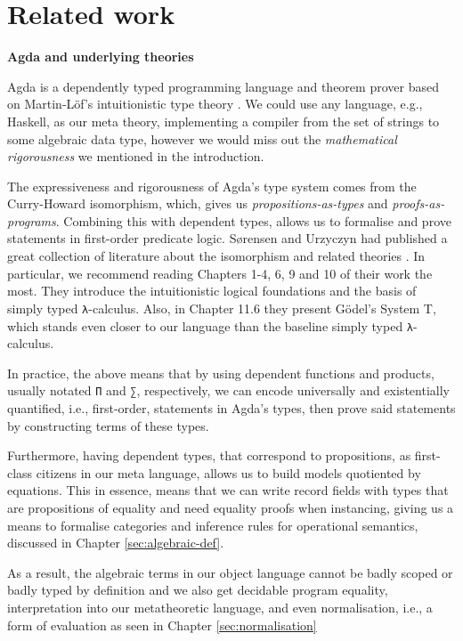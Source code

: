 \chapter{Related work}
\label{ch:relatedwork}

\noindent\textbf{Agda and underlying theories}

Agda \cite{agda} is a dependently typed programming language and theorem prover based on Martin-Löf's intuitionistic type theory \cite{martin1984intuitionistic}. We could use any language, e.g., Haskell, as our meta theory, implementing a compiler from the set of strings to some algebraic data type, however we would miss out the \textit{mathematical rigorousness} we mentioned in the introduction.

The expressiveness and rigorousness of Agda's type system comes from the Curry-Howard isomorphism, which, gives us \textit{propositions-as-types} and \textit{proofs-as-programs}. Combining this with dependent types, allows us to formalise and prove statements in first-order predicate logic. S{\o}rensen and Urzyczyn had published a great collection of literature about the isomorphism and related theories \cite{sorensen1998curry}. In particular, we recommend reading Chapters 1-4, 6, 9 and 10 of their work the most. They introduce the intuitionistic logical foundations and the basis of simply typed \verb$λ$-calculus. Also, in Chapter 11.6 they present Gödel's System T, which stands even closer to our language than the baseline simply typed \verb$λ$-calculus.

In practice, the above means that by using dependent functions and products, usually notated \verb$Π$ and \verb$∑$, respectively, we can encode universally and existentially quantified, i.e., first-order, statements in Agda's types, then prove said statements by constructing terms of these types.

Furthermore, having dependent types, that correspond to propositions, as first-class citizens in our meta language, allows us to build models quotiented by equations. This in essence, means that we can write record fields with types that are propositions of equality and need equality proofs when instancing, giving us a means to formalise categories and inference rules for operational semantics, discussed in Chapter \ref{sec:algebraic-def}.

As a result, the algebraic terms in our object language cannot be badly scoped or badly typed by definition and we also get decidable program equality, interpretation into our metatheoretic language, and even normalisation, i.e., a form of evaluation as seen in Chapter \ref{sec:normalisation}\\

